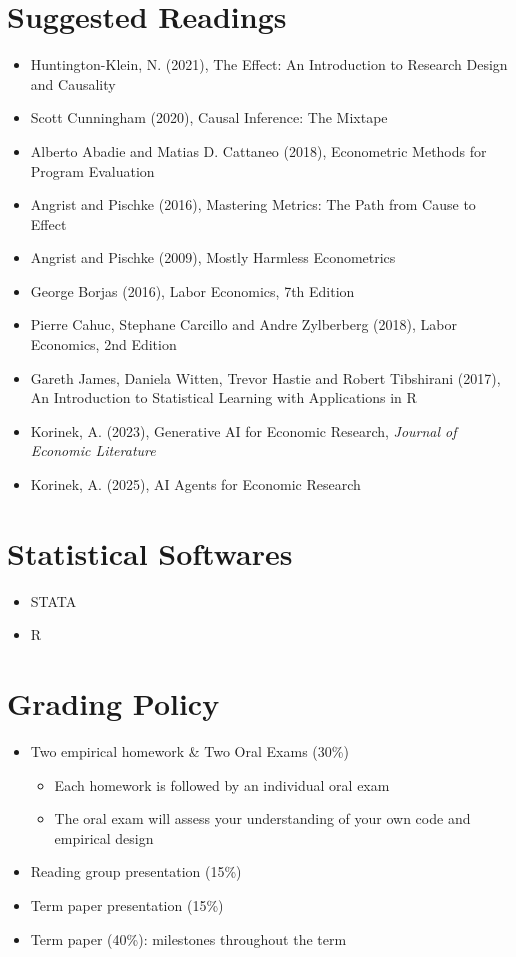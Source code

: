 \documentclass[11pt]{article}
\begin{document}
\section*{Suggested Readings}
\begin{itemize}
	\item Huntington-Klein, N. (2021), The Effect: An Introduction to Research Design and Causality
	\item Scott Cunningham (2020), Causal Inference: The Mixtape 
	\item Alberto Abadie and Matias D. Cattaneo (2018), Econometric Methods for Program Evaluation	
	\item Angrist and Pischke (2016), Mastering Metrics: The Path from Cause to Effect
	\item Angrist and Pischke (2009), Mostly Harmless Econometrics
	\item George Borjas (2016), Labor Economics, 7th Edition
	\item Pierre Cahuc, Stephane Carcillo and Andre Zylberberg (2018), Labor Economics, 2nd Edition 
	\item Gareth James, Daniela Witten, Trevor Hastie and Robert Tibshirani (2017), An Introduction to Statistical Learning with Applications in R
	\item Korinek, A. (2023), Generative AI for Economic Research, \textit{Journal of Economic Literature}
	\item Korinek, A. (2025), AI Agents for Economic Research
\end{itemize} 


\section*{Statistical Softwares}
\begin{itemize}
	\item STATA
	\item R
	
\end{itemize} 


\section*{Grading Policy}
\begin{itemize}
	\item Two empirical homework \& Two Oral Exams (30\%)
	\begin{itemize}
		\item Each homework is followed by an individual oral exam
		\item The oral exam will assess your understanding of your own code and empirical design
	\end{itemize}
	\item Reading group presentation (15\%)
	\item Term paper presentation (15\%)
	\item Term paper (40\%): milestones throughout the term
\end{itemize} 
\end{document}
